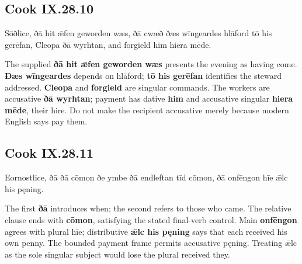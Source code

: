 \subsection*{Cook IX.28.10}

\par\begin{minipage}{\linewidth}\raggedright
Sōðlice, ðā hit ǣfen geworden wæs, ðā cwæð ðæs wīngeardes hlāford tō his gerēfan, Cleopa ðā wyrhtan, and forgield him hiera mēde.

The supplied \textbf{ðā hit ǣfen geworden wæs} presents the evening as having come. \textbf{Ðæs wīngeardes} depends on hlāford; \textbf{tō his gerēfan} identifies the steward addressed. \textbf{Cleopa} and \textbf{forgield} are singular commands. The workers are accusative \textbf{ðā wyrhtan}; payment has dative \textbf{him} and accusative singular \textbf{hiera mēde}, their hire. Do not make the recipient accusative merely because modern English says pay them.

\end{minipage}\par\addvspace{4pt}

\subsection*{Cook IX.28.11}

\par\begin{minipage}{\linewidth}\raggedright
Eornostlice, ðā ðā cōmon ðe ymbe ðā endleftan tīd cōmon, ðā onfēngon hīe ǣlc his pęning.

The first \textbf{ðā} introduces when; the second refers to those who came. The relative clause ends with \textbf{cōmon}, satisfying the stated final-verb control. Main \textbf{onfēngon} agrees with plural hīe; distributive \textbf{ǣlc his pęning} says that each received his own penny. The bounded payment frame permits accusative pęning. Treating ǣlc as the sole singular subject would lose the plural received they.

\end{minipage}\par\addvspace{4pt}

